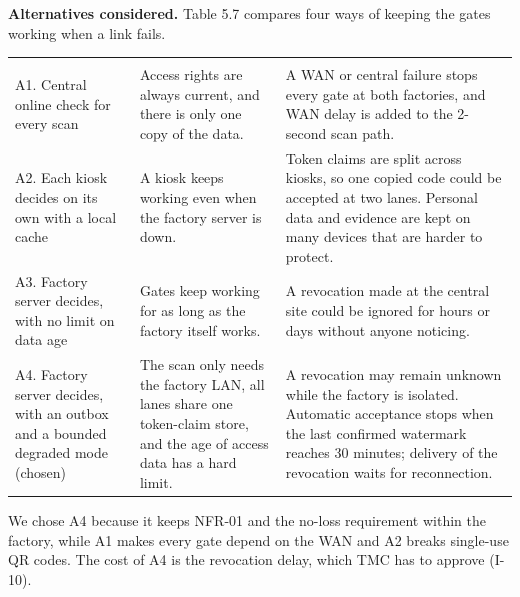 \textbf{Alternatives considered.} Table 5.7 compares four ways of keeping the gates working when a link fails.

\begin{longtable}{|>{\raggedright\arraybackslash}p{96pt}|>{\raggedright\arraybackslash}p{150pt}|>{\raggedright\arraybackslash}p{165pt}|}
\hline
\multicolumn{1}{|>{\columncolor{tableheader}\centering\arraybackslash}p{96pt}|}{\textbf{Option}} & \multicolumn{1}{>{\columncolor{tableheader}\centering\arraybackslash}p{150pt}|}{\textbf{Strength}} & \multicolumn{1}{>{\columncolor{tableheader}\centering\arraybackslash}p{165pt}|}{\textbf{Weakness}} \\
\hline
\endhead
\multicolumn{3}{c}{\rule{0pt}{20pt}\normalsize\phantomsection\addcontentsline{lot}{table}{\protect\numberline{5.7}Alternatives for Handling Connectivity Loss}\textbf{Table 5.7. Alternatives for Handling Connectivity Loss}} \\
\endlastfoot
A1. Central online check for every scan & Access rights are always current, and there is only one copy of the data. & A WAN or central failure stops every gate at both factories, and WAN delay is added to the 2-second scan path. \\
\hline
A2. Each kiosk decides on its own with a local cache & A kiosk keeps working even when the factory server is down. & Token claims are split across kiosks, so one copied code could be accepted at two lanes. Personal data and evidence are kept on many devices that are harder to protect. \\
\hline
A3. Factory server decides, with no limit on data age & Gates keep working for as long as the factory itself works. & A revocation made at the central site could be ignored for hours or days without anyone noticing. \\*
\hline\noalign{\nobreak}
A4. Factory server decides, with an outbox and a bounded degraded mode (chosen) & The scan only needs the factory LAN, all lanes share one token-claim store, and the age of access data has a hard limit. & A revocation may remain unknown while the factory is isolated. Automatic acceptance stops when the last confirmed watermark reaches 30 minutes; delivery of the revocation waits for reconnection. \\
\hline
\end{longtable}

We chose A4 because it keeps NFR-01 and the no-loss requirement within the factory, while A1 makes every gate depend on the WAN and A2 breaks single-use QR codes. The cost of A4 is the revocation delay, which TMC has to approve (I-10).

